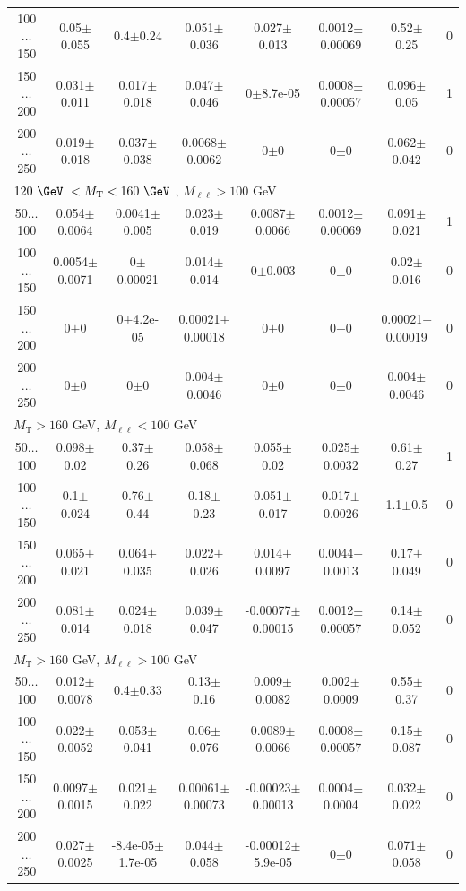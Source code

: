 \begin{landscape}
\begin{table}
\begin{center}
\begin{tabular}{| c | c c c c c c c | }
100$\dots$150&0.05$\pm$0.055&0.4$\pm$0.24&0.051$\pm$0.036&0.027$\pm$0.013&0.0012$\pm$0.00069&0.52$\pm$0.25&0\\
150$\dots$200&0.031$\pm$0.011&0.017$\pm$0.018&0.047$\pm$0.046&0$\pm$8.7e-05&0.0008$\pm$0.00057&0.096$\pm$0.05&1\\
200$\dots$250&0.019$\pm$0.018&0.037$\pm$0.038&0.0068$\pm$0.0062&0$\pm$0&0$\pm$0&0.062$\pm$0.042&0\\
\hline\hline
\multicolumn{8}{l}{$120~\GeV~< M_{\text{T}} < 160~\GeV~$, $M_{\ell\ell} > 100$ GeV}\\\hline\hline
50$\dots$100&0.054$\pm$0.0064&0.0041$\pm$0.005&0.023$\pm$0.019&0.0087$\pm$0.0066&0.0012$\pm$0.00069&0.091$\pm$0.021&1\\
100$\dots$150&0.0054$\pm$0.0071&0$\pm$0.00021&0.014$\pm$0.014&0$\pm$0.003&0$\pm$0&0.02$\pm$0.016&0\\
150$\dots$200&0$\pm$0&0$\pm$4.2e-05&0.00021$\pm$0.00018&0$\pm$0&0$\pm$0&0.00021$\pm$0.00019&0\\
200$\dots$250&0$\pm$0&0$\pm$0&0.004$\pm$0.0046&0$\pm$0&0$\pm$0&0.004$\pm$0.0046&0\\
\hline\hline
\multicolumn{8}{l}{$M_{\text{T}} > 160$ GeV, $M_{\ell\ell} < 100$ GeV}\\\hline\hline
50$\dots$100&0.098$\pm$0.02&0.37$\pm$0.26&0.058$\pm$0.068&0.055$\pm$0.02&0.025$\pm$0.0032&0.61$\pm$0.27&1\\
100$\dots$150&0.1$\pm$0.024&0.76$\pm$0.44&0.18$\pm$0.23&0.051$\pm$0.017&0.017$\pm$0.0026&1.1$\pm$0.5&0\\
150$\dots$200&0.065$\pm$0.021&0.064$\pm$0.035&0.022$\pm$0.026&0.014$\pm$0.0097&0.0044$\pm$0.0013&0.17$\pm$0.049&0\\
200$\dots$250&0.081$\pm$0.014&0.024$\pm$0.018&0.039$\pm$0.047&-0.00077$\pm$0.00015&0.0012$\pm$0.00057&0.14$\pm$0.052&0\\
\hline\hline
\multicolumn{8}{l}{$M_{\text{T}} > 160$ GeV, $M_{\ell\ell} > 100$ GeV}\\\hline\hline
50$\dots$100&0.012$\pm$0.0078&0.4$\pm$0.33&0.13$\pm$0.16&0.009$\pm$0.0082&0.002$\pm$0.0009&0.55$\pm$0.37&0\\
100$\dots$150&0.022$\pm$0.0052&0.053$\pm$0.041&0.06$\pm$0.076&0.0089$\pm$0.0066&0.0008$\pm$0.00057&0.15$\pm$0.087&0\\
150$\dots$200&0.0097$\pm$0.0015&0.021$\pm$0.022&0.00061$\pm$0.00073&-0.00023$\pm$0.00013&0.0004$\pm$0.0004&0.032$\pm$0.022&0\\
200$\dots$250&0.027$\pm$0.0025&-8.4e-05$\pm$1.7e-05&0.044$\pm$0.058&-0.00012$\pm$5.9e-05&0$\pm$0&0.071$\pm$0.058&0\\

\end{tabular}
\end{center}
\end{table}
\end{landscape}
